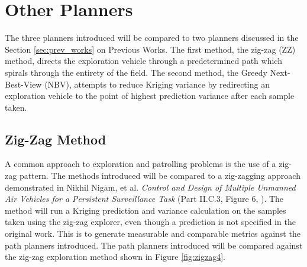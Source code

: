 \section{Other Planners}
The three planners introduced will be compared to two planners discussed in the Section \ref{sec:prev_works} on Previous Works. The first method, the zig-zag (ZZ) method, directs the exploration vehicle through a predetermined path which spirals through the entirety of the field. The second method, the Greedy Next-Best-View (NBV), attempts to reduce Kriging variance by redirecting an exploration vehicle to the point of highest prediction variance after each sample taken.

\subsection{Zig-Zag Method}
A common approach to exploration and patrolling problems is the use of a zig-zag pattern. The methods introduced will be compared to a zig-zagging approach demonstrated in Nikhil Nigam, et al. \textit{Control and Design of Multiple Unmanned Air Vehicles for a Persistent Surveillance Task} (Part II.C.3, Figure 6, \cite{nigam:zigzag}). The method will run a Kriging prediction and variance calculation on the samples taken using the zig-zag explorer, even though a prediction is not specified in the original work. This is to generate measurable and comparable metrics against the path planners introduced. The path planners introduced will be compared against the zig-zag exploration method shown in Figure \ref{fig:zigzag4}.

